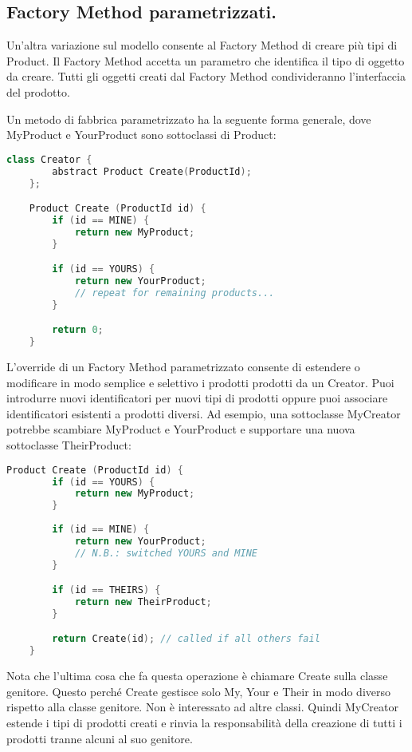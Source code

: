 \subsection{Factory Method parametrizzati.}
Un'altra variazione sul modello consente al Factory Method di creare più tipi di Product. Il Factory Method accetta un parametro che identifica il tipo di oggetto da creare. Tutti gli oggetti creati dal Factory Method condivideranno l'interfaccia del prodotto.

Un metodo di fabbrica parametrizzato ha la seguente forma generale, dove MyProduct e YourProduct sono sottoclassi di Product:

\begin{lstlisting}[language=c++]
    class Creator {
        abstract Product Create(ProductId);
    };

    Product Create (ProductId id) {
        if (id == MINE) {
            return new MyProduct;
        }

        if (id == YOURS) {
            return new YourProduct;
            // repeat for remaining products...
        }

        return 0; 
    }
\end{lstlisting}

L'override di un Factory Method parametrizzato consente di estendere o modificare in modo semplice e selettivo i prodotti prodotti da un Creator. Puoi introdurre nuovi identificatori per nuovi tipi di prodotti oppure puoi associare identificatori esistenti a prodotti diversi.
Ad esempio, una sottoclasse MyCreator potrebbe scambiare MyProduct e YourProduct e supportare una nuova sottoclasse TheirProduct:

\begin{lstlisting}[language=c++]
    Product Create (ProductId id) {
        if (id == YOURS) {
            return new MyProduct;
        }
        
        if (id == MINE) {
            return new YourProduct;
            // N.B.: switched YOURS and MINE
        }

        if (id == THEIRS) {
            return new TheirProduct;
        }

        return Create(id); // called if all others fail
    }
\end{lstlisting}

Nota che l'ultima cosa che fa questa operazione è chiamare Create sulla classe genitore. Questo perché Create gestisce solo My, Your e Their in modo diverso rispetto alla classe genitore. Non è interessato ad altre classi. Quindi MyCreator estende i tipi di prodotti creati e rinvia la responsabilità della creazione di tutti i prodotti tranne alcuni al suo genitore.

